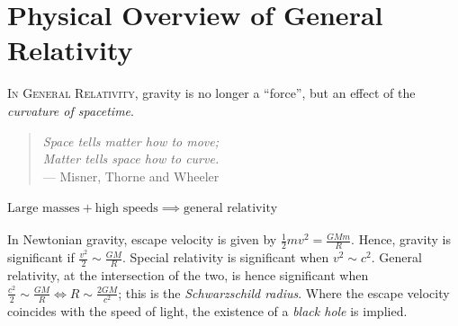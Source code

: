 { %
\renewcommand{\thechapter}{\arabic{chapter}} %
\chapter{Physical Overview of General Relativity}
}

\textsc{In General Relativity}, gravity is no longer a ``force'', but an effect of the \emph{curvature of spacetime}.

\begin{quote}
	\emph{Space tells matter how to move; \\
	\hspace*{1em} Matter tells space how to curve.} \\
	\hspace*{2em} --- Misner, Thorne and Wheeler
\end{quote}

\begin{center}
\end{center}

\subsubsection*{$\text{Large masses} + \text{high speeds} \implies \text{general relativity}$}
In Newtonian gravity, escape velocity is given by $\frac12mv^2 = \frac{GMm}{R}$.
Hence, gravity is significant if $\frac{v^2}{2} \sim \frac{GM}{R}$.
Special relativity is significant when $v^2 \sim c^2$.
General relativity, at the intersection of the two, is hence significant when $\frac{c^2}{2} \sim \frac{GM}{R} \iff R \sim \frac{2GM}{c^2}$; this is the \emph{Schwarzschild radius}.
Where the escape velocity coincides with the speed of light, the existence of a \emph{black hole} is implied.